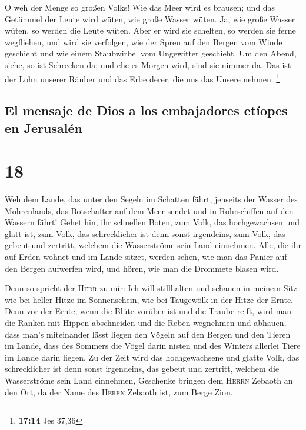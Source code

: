  O weh der Menge so großen Volks! Wie das Meer wird es
brausen; und das Getümmel der Leute wird wüten, wie große Wasser wüten.
 Ja, wie große Wasser wüten, so werden die Leute wüten.
Aber er wird sie schelten, so werden sie ferne wegfliehen, und wird sie
verfolgen, wie der Spreu auf den Bergen vom Winde geschieht und wie
einem Staubwirbel vom Ungewitter geschieht.  Um den
Abend, siehe, so ist Schrecken da; und ehe es Morgen wird, sind sie
nimmer da. Das ist der Lohn unserer Räuber und das Erbe derer, die uns
das Unsere nehmen. \footnote{\textbf{17:14} Jes 37,36}

\hypertarget{el-mensaje-de-dios-a-los-embajadores-etuxedopes-en-jerusaluxe9n}{%
\subsection{El mensaje de Dios a los embajadores etíopes en
Jerusalén}\label{el-mensaje-de-dios-a-los-embajadores-etuxedopes-en-jerusaluxe9n}}

\hypertarget{section-17}{%
\section{18}\label{section-17}}

 Weh dem Lande, das unter den Segeln im Schatten fährt,
jenseits der Wasser des Mohrenlands,  das Botschafter auf
dem Meer sendet und in Rohrschiffen auf den Wassern fährt! Gehet hin,
ihr schnellen Boten, zum Volk, das hochgewachsen und glatt ist, zum
Volk, das schrecklicher ist denn sonst irgendeins, zum Volk, das gebeut
und zertritt, welchem die Wasserströme sein Land einnehmen.
 Alle, die ihr auf Erden wohnet und im Lande sitzet,
werden sehen, wie man das Panier auf den Bergen aufwerfen wird, und
hören, wie man die Drommete blasen wird.

 Denn so spricht der \textsc{Herr} zu mir: Ich will
stillhalten und schauen in meinem Sitz wie bei heller Hitze im
Sonnenschein, wie bei Taugewölk in der Hitze der Ernte. 
Denn vor der Ernte, wenn die Blüte vorüber ist und die Traube reift,
wird man die Ranken mit Hippen abschneiden und die Reben wegnehmen und
abhauen,  dass man's miteinander lässt liegen den Vögeln
auf den Bergen und den Tieren im Lande, dass des Sommers die Vögel darin
nisten und des Winters allerlei Tiere im Lande darin liegen.
 Zu der Zeit wird das hochgewachsene und glatte Volk, das
schrecklicher ist denn sonst irgendeins, das gebeut und zertritt,
welchem die Wasserströme sein Land einnehmen, Geschenke bringen dem
\textsc{Herrn} Zebaoth an den Ort, da der Name des \textsc{Herrn}
Zebaoth ist, zum Berge Zion.

